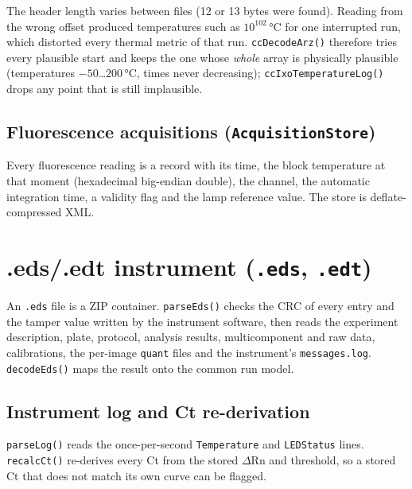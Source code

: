 \begin{infobox}
The header length varies between files (12 or 13 bytes were found). Reading from the wrong offset produced temperatures such as
$10^{102}$\,°C for one interrupted run, which distorted every thermal metric of that run. \texttt{ccDecodeArz()} therefore
tries every plausible start and keeps the one whose \emph{whole} array is physically plausible (temperatures $-50$\dots$200$\,°C,
times never decreasing); \texttt{ccIxoTemperatureLog()} drops any point that is still implausible.
\end{infobox}





\subsection*{Fluorescence acquisitions (\texttt{AcquisitionStore})}
Every fluorescence reading is a record with its time, the block temperature at that moment (hexadecimal big-endian double),
the channel, the automatic integration time, a validity flag and the lamp reference value. The store is deflate-compressed XML.



\section{.eds/.edt instrument (\texttt{.eds}, \texttt{.edt})}
An \texttt{.eds} file is a ZIP container. \texttt{parseEds()} checks the CRC of every entry and the tamper value written by the
instrument software, then reads the experiment description, plate, protocol, analysis results, multicomponent and raw data,
calibrations, the per-image \texttt{quant} files and the instrument's \texttt{messages.log}. \texttt{decodeEds()} maps the result
onto the common run model.




\subsection*{Instrument log and Ct re-derivation}
\texttt{parseLog()} reads the once-per-second \texttt{Temperature} and \texttt{LEDStatus} lines. \texttt{recalcCt()} re-derives
every Ct from the stored $\Delta$Rn and threshold, so a stored Ct that does not match its own curve can be flagged.




